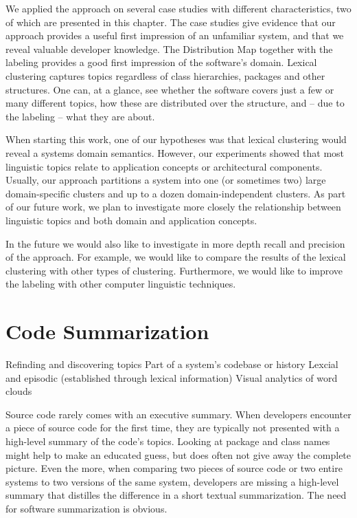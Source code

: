 We applied the approach on several case studies with different characteristics, two of which are presented in this chapter.  The case studies give evidence that our approach provides a useful first impression of an unfamiliar system, and that we reveal valuable developer knowledge. The Distribution Map together with the labeling provides a good first impression of the software's domain. Lexical clustering captures topics regardless of class hierarchies, packages and other structures. One can, at a glance, see whether the software covers just a few or many different topics, how these are distributed over the structure, and -- due to the labeling -- what they are about.

When starting this work, one of our hypotheses was that lexical clustering would reveal a systems domain semantics. However, our experiments showed that most linguistic topics relate to application concepts or architectural components. Usually, our approach partitions a system into one (or sometimes two) large domain-specific clusters and up to a dozen domain-independent clusters. As part of our future work, we plan to investigate more closely the relationship between linguistic topics and both domain and application concepts.

In the future we would also like to investigate in more depth recall and precision of the approach. For example, we would like to compare the results of the lexical clustering with other types of clustering. Furthermore, we would like to improve the labeling with other computer linguistic techniques.


\chapter{Code Summarization}
\label{the chapter on LogLR}

\infobox
	{Refinding and discovering topics}
	{Part of a system's codebase or history}
	{Lexcial and episodic (established through lexical information)}
	{Visual analytics of word clouds}

Source code rarely comes with an executive summary. When developers encounter a piece of source code for the first time, they are typically not presented with a high-level summary of the code's topics. Looking at package and class names might help to make an educated guess, but does often not give away the complete picture. Even the more, when comparing two pieces of source code or two entire systems to two versions of the same system, developers are missing a high-level summary that distilles the difference in a short textual summarization. The need for software summarization is obvious.


